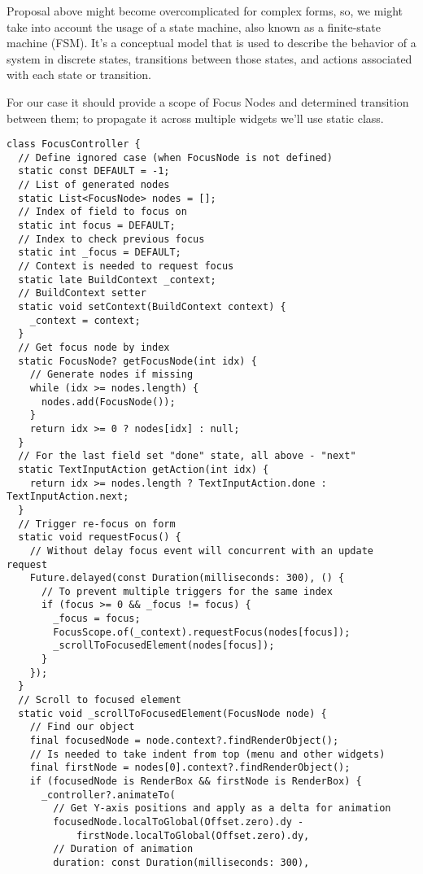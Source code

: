 Proposal above might become overcomplicated for complex forms, so, we might take into account the usage of a state 
machine, also known as a finite-state machine (FSM). It's a conceptual model that is used to describe the behavior of a 
system in discrete states, transitions between those states, and actions associated with each state or transition.

For our case it should provide a scope of Focus Nodes and determined transition between them; to propagate it across
multiple widgets we'll use static class.

\begin{lstlisting}
class FocusController {
  // Define ignored case (when FocusNode is not defined)
  static const DEFAULT = -1;
  // List of generated nodes
  static List<FocusNode> nodes = [];
  // Index of field to focus on
  static int focus = DEFAULT;
  // Index to check previous focus
  static int _focus = DEFAULT;
  // Context is needed to request focus
  static late BuildContext _context;
  // BuildContext setter
  static void setContext(BuildContext context) {
    _context = context;
  }
  // Get focus node by index
  static FocusNode? getFocusNode(int idx) {
    // Generate nodes if missing
    while (idx >= nodes.length) {
      nodes.add(FocusNode());
    }
    return idx >= 0 ? nodes[idx] : null;
  }
  // For the last field set "done" state, all above - "next"
  static TextInputAction getAction(int idx) {
    return idx >= nodes.length ? TextInputAction.done : TextInputAction.next;
  }
  // Trigger re-focus on form
  static void requestFocus() {
    // Without delay focus event will concurrent with an update request
    Future.delayed(const Duration(milliseconds: 300), () {
      // To prevent multiple triggers for the same index
      if (focus >= 0 && _focus != focus) {
        _focus = focus;
        FocusScope.of(_context).requestFocus(nodes[focus]);
        _scrollToFocusedElement(nodes[focus]);
      }
    });
  }
  // Scroll to focused element
  static void _scrollToFocusedElement(FocusNode node) {
    // Find our object
    final focusedNode = node.context?.findRenderObject();
    // Is needed to take indent from top (menu and other widgets)
    final firstNode = nodes[0].context?.findRenderObject();
    if (focusedNode is RenderBox && firstNode is RenderBox) {
      _controller?.animateTo(
        // Get Y-axis positions and apply as a delta for animation
        focusedNode.localToGlobal(Offset.zero).dy -
            firstNode.localToGlobal(Offset.zero).dy,
        // Duration of animation
        duration: const Duration(milliseconds: 300),

\end{lstlisting}
